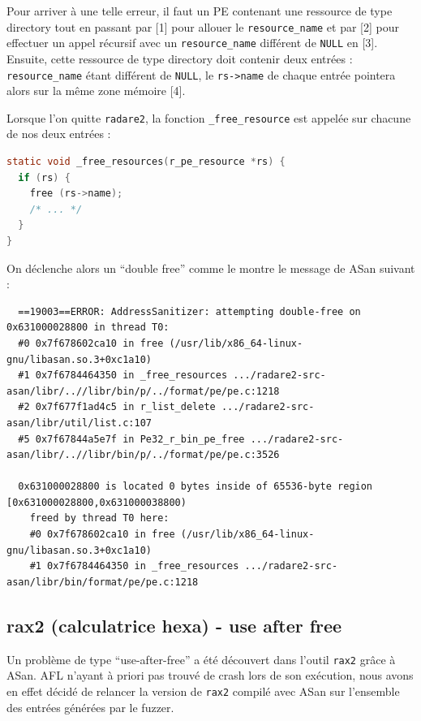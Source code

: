 Pour arriver à une telle erreur, il faut un PE contenant une ressource de type directory tout en passant par [1] pour allouer le \lstinline{resource_name} et par [2] pour effectuer un appel récursif avec un \lstinline{resource_name} différent de \lstinline{NULL} en [3].
Ensuite, cette ressource de type directory doit contenir deux entrées : \lstinline{resource_name} étant différent de \lstinline{NULL}, le \lstinline{rs->name} de chaque entrée pointera alors sur la même zone mémoire [4].

Lorsque l'on quitte \lstinline{radare2}, la fonction \lstinline{_free_resource} est appelée sur chacune de nos deux entrées :

\begin{lstlisting}[language=C]
static void _free_resources(r_pe_resource *rs) {
  if (rs) {
    free (rs->name);
    /* ... */
  }
}
\end{lstlisting}

On déclenche alors un ``double free'' comme le montre le message de ASan suivant :

\begin{lstlisting}
  ==19003==ERROR: AddressSanitizer: attempting double-free on 0x631000028800 in thread T0:
  #0 0x7f678602ca10 in free (/usr/lib/x86_64-linux-gnu/libasan.so.3+0xc1a10)
  #1 0x7f6784464350 in _free_resources .../radare2-src-asan/libr/..//libr/bin/p/../format/pe/pe.c:1218
  #2 0x7f677f1ad4c5 in r_list_delete .../radare2-src-asan/libr/util/list.c:107
  #5 0x7f67844a5e7f in Pe32_r_bin_pe_free .../radare2-src-asan/libr/..//libr/bin/p/../format/pe/pe.c:3526

  0x631000028800 is located 0 bytes inside of 65536-byte region [0x631000028800,0x631000038800)
    freed by thread T0 here:
    #0 0x7f678602ca10 in free (/usr/lib/x86_64-linux-gnu/libasan.so.3+0xc1a10)
    #1 0x7f6784464350 in _free_resources .../radare2-src-asan/libr/bin/format/pe/pe.c:1218
\end{lstlisting}


\subsection{rax2 (calculatrice hexa) - use after free}

Un problème de type ``use-after-free'' a été découvert dans l'outil \lstinline{rax2} grâce à ASan.
AFL n'ayant à priori pas trouvé de crash lors de son exécution, nous avons en effet décidé de relancer la version de \lstinline{rax2} compilé avec ASan sur l'ensemble des entrées générées par le fuzzer.

